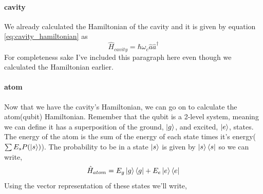 \documentclass[english, a4paper, 12pt, twoside]{article}
\numberwithin{equation}{section} %
\begin{document}
\paragraph*{cavity}
We already calculated the Hamiltonian of the cavity and it is given by equation \ref{eq:cavity_hamiltonian} as
\begin{equation}
    \boxed{\hat{H}_{cavity} = \hbar\omega_c\hat{a}\hat{a}^\dag}
\end{equation}
For completeness sake I've included this paragraph here even though we calculated the Hamiltonian earlier.

\paragraph*{atom}

Now that we have the cavity's Hamiltonian, we can go on to calculate the atom(qubit) Hamiltonian. \newline
Remember that the qubit is a 2-level system, meaning we can define it has a superposition of the ground, $\ket{g}$, and excited, $\ket{e}$, states. The energy of the atom is the sum of the energy of each state times it's energy($\sum E_sP(\ket{s})$). The probability to be in a state $\ket{s}$ is given by $\ket{s}\bra{s}$ so we can write,
\begin{equation}
    \hat{H}_{atom} = E_g\ket{g}\bra{g} + E_e\ket{e}\bra{e}
\end{equation}
Using the vector representation of these states we'll write,
\end{document}
